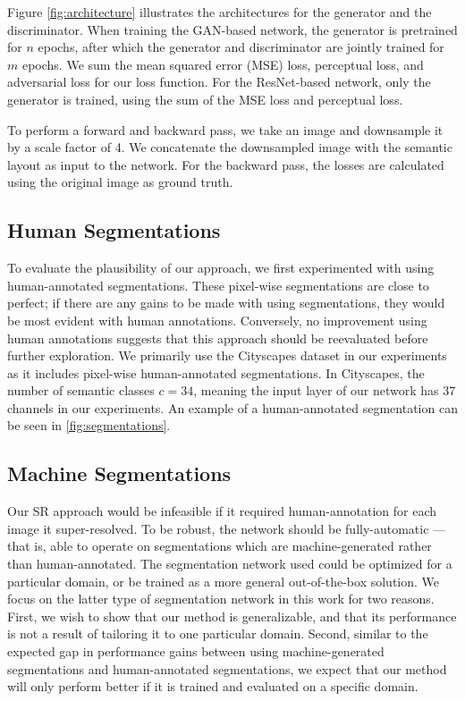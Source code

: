 \documentclass[10pt,twocolumn,letterpaper]{article}
\begin{document}
Figure \ref{fig:architecture} illustrates the architectures for the generator and
the discriminator. When training the GAN-based network, the generator is
pretrained for $n$ epochs, after which the generator and discriminator are
jointly trained for $m$ epochs. We sum the mean squared error (MSE) loss,
perceptual loss, and adversarial loss for our loss function. For the
ResNet-based network, only the generator is trained, using the sum of the MSE
loss and perceptual loss.

To perform a forward and backward pass, we take an image and downsample it by a
scale factor of 4. We concatenate the downsampled image with the semantic
layout as input to the network. For the backward pass, the losses are
calculated using the original image as ground truth.

\subsection{Human Segmentations}
To evaluate the plausibility of our approach, we first experimented with using
human-annotated segmentations. These pixel-wise segmentations are close to
perfect; if there are any gains to be made with using segmentations, they would
be most evident with human annotations. Conversely, no improvement using human
annotations suggests that this approach should be reevaluated before further
exploration. We primarily use the Cityscapes \cite{Cityscapes} dataset in our
experiments as it includes pixel-wise human-annotated segmentations. In
Cityscapes, the number of semantic classes $c = 34$, meaning the input layer of
our network has 37 channels in our experiments. An example of a human-annotated
segmentation can be seen in \ref{fig:segmentations}.

\subsection{Machine Segmentations}
Our SR approach would be infeasible if it required human-annotation for each
image it super-resolved. To be robust, the network should be fully-automatic
--- that is, able to operate on segmentations which are machine-generated
rather than human-annotated. The segmentation network used could be optimized
for a particular domain, or be trained as a more general out-of-the-box
solution. We focus on the latter type of segmentation network in this work for
two reasons. First, we wish to show that our method is generalizable, and that
its performance is not a result of tailoring it to one particular domain.
Second, similar to the expected gap in performance gains between using
machine-generated segmentations and human-annotated segmentations, we expect
that our method will only perform better if it is trained and evaluated on a
specific domain.
\end{document}
